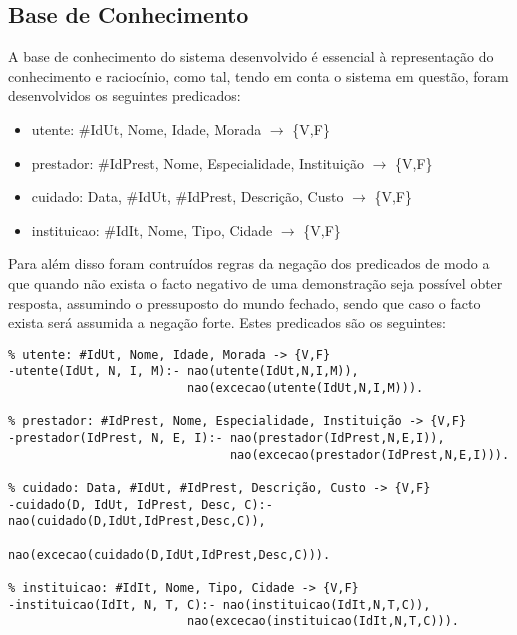 \documentclass{article}
\begin{document}
\subsection{Base de Conhecimento}
A base de conhecimento do sistema desenvolvido é essencial à representação do conhecimento e raciocínio, como tal, tendo em conta o sistema em questão, foram desenvolvidos os seguintes predicados:
\begin{itemize}
	\item utente: \#IdUt, Nome, Idade, Morada $\to$ \{V,F\}
    \item prestador: \#IdPrest, Nome, Especialidade, Instituição $\to$ \{V,F\}
    \item cuidado: Data, \#IdUt, \#IdPrest, Descrição, Custo $\to$ \{V,F\}
    \item instituicao: \#IdIt, Nome, Tipo, Cidade $\to$ \{V,F\}
\end{itemize}
Para além disso foram contruídos regras da negação dos predicados de modo a que quando não exista o facto negativo de uma demonstração seja possível obter resposta, assumindo o pressuposto do mundo fechado, sendo que caso o facto exista será assumida a negação forte. Estes predicados são os seguintes:
\begin{verbatim}
% utente: #IdUt, Nome, Idade, Morada -> {V,F}
-utente(IdUt, N, I, M):- nao(utente(IdUt,N,I,M)),
                         nao(excecao(utente(IdUt,N,I,M))).

% prestador: #IdPrest, Nome, Especialidade, Instituição -> {V,F}
-prestador(IdPrest, N, E, I):- nao(prestador(IdPrest,N,E,I)),
                               nao(excecao(prestador(IdPrest,N,E,I))).

% cuidado: Data, #IdUt, #IdPrest, Descrição, Custo -> {V,F}
-cuidado(D, IdUt, IdPrest, Desc, C):- nao(cuidado(D,IdUt,IdPrest,Desc,C)),
                                      nao(excecao(cuidado(D,IdUt,IdPrest,Desc,C))).

% instituicao: #IdIt, Nome, Tipo, Cidade -> {V,F}
-instituicao(IdIt, N, T, C):- nao(instituicao(IdIt,N,T,C)),
                         nao(excecao(instituicao(IdIt,N,T,C))).
\end{verbatim}
\end{document}
